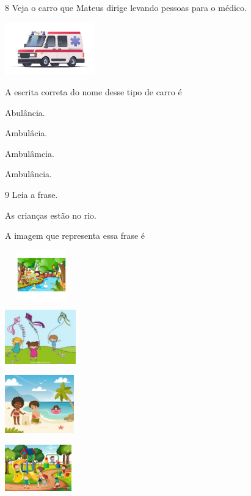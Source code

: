 \num{8} Veja o carro que Mateus dirige levando pessoas para o médico.

\includegraphics[width=1.54514in,height=0.89444in]{media/image153.jpeg}


A escrita correta do nome desse tipo de carro é

\begin{escolha}
\item Abulância.

\item Ambulâcia.

\item Ambulâmcia.

\item Ambulância.
\end{escolha}

\num{9} Leia a frase.

As crianças estão no rio.

A imagem que representa essa frase é

\begin{escolha}
\item \includegraphics[width=1.25000in,height=0.82361in]{media/image154.jpeg}

\item \includegraphics[width=1.21181in,height=0.92014in]{media/image155.jpeg}

\item \includegraphics[width=1.18125in,height=0.98472in]{media/image156.jpeg}

\item \includegraphics[width=1.13611in,height=0.80208in]{media/image157.jpeg}
\end{escolha}

